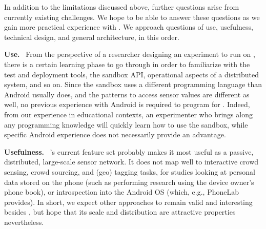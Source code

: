 In addition to the limitations discussed above, further questions 
arise from currently existing challenges. We hope to be able to 
answer these questions as we gain more practical experience with 
\sysname.
We approach questions of use, usefulness, technical design, and
general architecture, in this order.


\textbf{Use.}~
From the perspective of a researcher designing an experiment to 
run on \sysname, there is a certain learning phase 
to go through in order to familiarize with the test and deployment 
tools, the sandbox API, operational aspects of a distributed system, 
and so on. Since the sandbox uses a different programming language 
than Android usually does, and the patterns to access sensor values 
are different as well, no previous experience with Android is required 
to program for \sysname. Indeed, from our experience in 
educational contexts, an experimenter who brings along any programming 
knowledge will quickly learn how to use the sandbox, while specific 
Android experience does not necessarily provide an advantage.


\textbf{Usefulness.}~
\sysname's current feature set probably makes it most 
useful as a passive, distributed, large-scale sensor network. 
It does not map well to interactive crowd sensing, crowd sourcing, 
and (geo) tagging tasks, for studies looking at personal data stored 
on the phone (such as performing research using the device owner's 
phone book),
or introspection into the Android OS (which, e.g., PhoneLab provides). 
In short, we expect other approaches to remain valid and interesting 
besides \sysname, but hope that its scale and distribution 
are attractive properties nevertheless.


